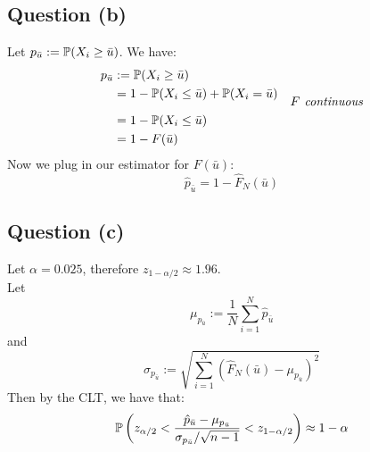\documentclass[12pt]{article}
\begin{document}
\subsection{Question (b)}
Let \(p_{\bar{u}} := \P(X_i \geq \bar{u})\). We have:
\begin{align*}
    p_{\bar{u}}
     & := \P(X_i \geq \bar{u})                                                 \\
     & = 1 - \P(X_i \leq \bar{u}) + \P(X_i = \bar{u})                          \\[-.3cm]
     &                                                & F \textit{ continuous} \\
     & = 1 - \P(X_i \leq \bar{u})                                              \\
     & = 1 - F(\bar{u})                                                        \\
\end{align*}
Now we plug in our estimator for \(F (\bar{u})\):
\[
    \hat{p}_{\bar{u}} = 1 - \hat{F}_N (\bar u)
\]

\subsection{Question (c)}
Let \(\alpha = 0.025\), therefore \(z_{1 - \alpha/2} \approx 1.96\).\\
Let
\[
    \mu_{p_{\bar u}} := \frac{1}{N} \sum_{i=1}^N \hat{p}_{\bar{u}}
\]
and
\[
    \sigma_{p_{\bar u}} := \sqrt{\sum_{i=1}^N \left(\hat F_N (\bar{u}) - \mu_{p_{\bar u}}\right)^2}
\]
Then by the CLT, we have that:
\begin{align*}
    \P \left( z_{\alpha/2} < \frac{\hat p_{\bar u} - \mu_{p_{\bar u}}}{\sigma_{p_{\bar u}} / \sqrt{n-1}} < z_{1 - \alpha/2} \right) \approx 1 - \alpha
\end{align*}
\end{document}
